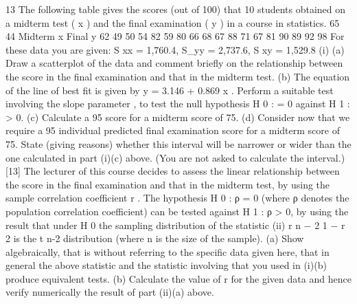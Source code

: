 13
The following table gives the scores (out of 100) that 10 students obtained on a
midterm test ( x ) and the final examination ( y ) in a course in statistics.
65
44
Midterm x
Final y
62
49
50
54
82
59
80
66
68
67
88
71
67
81
90
89
92
98
For these data you are given: S xx = 1,760.4, S_{yy} = 2,737.6, S xy = 1,529.8
(i)
(a) Draw a scatterplot of the data and comment briefly on the relationship
between the score in the final examination and that in the midterm test.
(b) The equation of the line of best fit is given by y = 3.146 + 0.869 x .
Perform a suitable test involving the slope parameter \beta , to test the null
hypothesis H 0 : \beta  = 0 against H 1 : \beta  > 0.
(c) Calculate a 95%
score for a midterm score of 75.
(d) Consider now that we require a 95%
individual predicted final examination score for a midterm score of 75.
State (giving reasons) whether this interval will be narrower or wider
than the one calculated in part (i)(c) above. (You are not asked to
calculate the interval.)
[13]
The lecturer of this course decides to assess the linear relationship between the score
in the final examination and that in the midterm test, by using the sample correlation
coefficient r .
The hypothesis H 0 : ρ = 0 (where ρ denotes the population correlation coefficient) can
be tested against H 1 : ρ > 0, by using the result that under H 0 the sampling distribution
of the statistic
(ii)
r n − 2
1 − r 2
is the t n-2 distribution (where n is the size of the sample).
(a) Show algebraically, that is without referring to the specific data given
here, that in general the above statistic and the statistic involving \beta  that
you used in (i)(b) produce equivalent tests.
(b) Calculate the value of r for the given data and hence verify numerically
the result of part (ii)(a) above.





